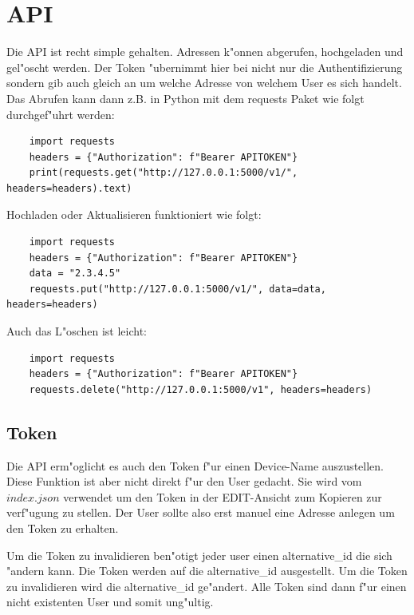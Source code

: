 \section{API}\label{sec:api_views}
Die API ist recht simple gehalten.
Adressen k{"o}nnen abgerufen, hochgeladen und gel{"o}scht werden.
Der Token {"u}bernimmt hier bei nicht nur die Authentifizierung sondern gib auch gleich an um welche Adresse von welchem User es sich handelt.
Das Abrufen kann dann z.B. in Python mit dem requests Paket wie folgt durchgef{"u}hrt werden:

\vspace{3mm}
\begin{lstlisting}
    import requests
    headers = {"Authorization": f"Bearer APITOKEN"}
    print(requests.get("http://127.0.0.1:5000/v1/", headers=headers).text)
\end{lstlisting}
\vspace{3mm}

Hochladen oder Aktualisieren funktioniert wie folgt:
\vspace{3mm}
\begin{lstlisting}
    import requests
    headers = {"Authorization": f"Bearer APITOKEN"}
    data = "2.3.4.5"
    requests.put("http://127.0.0.1:5000/v1/", data=data, headers=headers)
\end{lstlisting}
\vspace{3mm}

Auch das L{"o}schen ist leicht:
\vspace{3mm}
\begin{lstlisting}
    import requests
    headers = {"Authorization": f"Bearer APITOKEN"}
    requests.delete("http://127.0.0.1:5000/v1", headers=headers)
\end{lstlisting}
\vspace{3mm}

\subsection{Token}\label{subsec:token}
Die API erm{"o}glicht es auch den Token f{"u}r einen Device-Name auszustellen.
Diese Funktion ist aber nicht direkt f{"u}r den User gedacht.
Sie wird vom $index.json$ verwendet um den Token in der EDIT-Ansicht zum Kopieren zur verf{"u}gung zu stellen.
Der User sollte also erst manuel eine Adresse anlegen um den Token zu erhalten.

Um die Token zu invalidieren ben{"o}tigt jeder user einen alternative\_id die sich {"a}ndern kann.
Die Token werden auf die alternative\_id ausgestellt.
Um die Token zu invalidieren wird die alternative\_id ge{"a}ndert.
Alle Token sind dann f{"u}r einen nicht existenten User und somit ung{"u}ltig.

